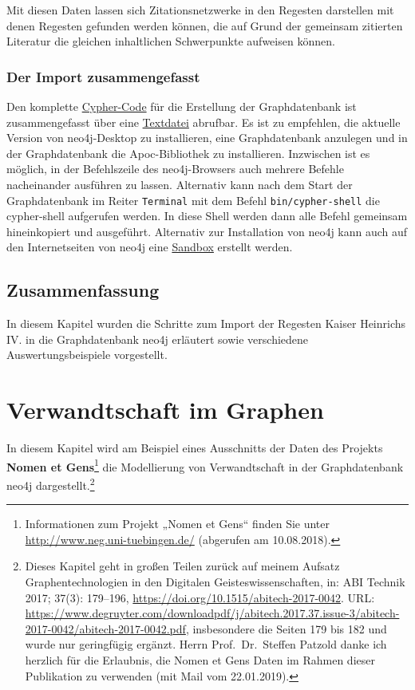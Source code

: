 \documentclass[ngerman,]{scrreprt}
\begin{document}
Mit diesen Daten lassen sich Zitationsnetzwerke in den Regesten darstellen mit denen Regesten gefunden werden können, die auf Grund der gemeinsam zitierten Literatur die gleichen inhaltlichen Schwerpunkte aufweisen können.

\hypertarget{der-import-zusammengefasst}{%
\subsection{Der Import zusammengefasst}\label{der-import-zusammengefasst}}

Den komplette \href{cypher/20_cypher-Datenbankerstellung.txt}{Cypher-Code} für die Erstellung der Graphdatenbank ist zusammengefasst über eine \href{cypher/20_cypher-Datenbankerstellung.txt}{Textdatei} abrufbar. Es ist zu empfehlen, die aktuelle Version von neo4j-Desktop zu installieren, eine Graphdatenbank anzulegen und in der Graphdatenbank die Apoc-Bibliothek zu installieren. Inzwischen ist es möglich, in der Befehlszeile des neo4j-Browsers auch mehrere Befehle nacheinander ausführen zu lassen. Alternativ kann nach dem Start der Graphdatenbank im Reiter \texttt{Terminal} mit dem Befehl \texttt{bin/cypher-shell} die cypher-shell aufgerufen werden. In diese Shell werden dann alle Befehl gemeinsam hineinkopiert und ausgeführt. Alternativ zur Installation von neo4j kann auch auf den Internetseiten von neo4j eine \href{https://neo4j.com/lp/try-neo4j-sandbox}{Sandbox} erstellt werden.

\hypertarget{zusammenfassung-2}{%
\section{Zusammenfassung}\label{zusammenfassung-2}}

In diesem Kapitel wurden die Schritte zum Import der Regesten Kaiser Heinrichs IV. in die Graphdatenbank neo4j erläutert sowie verschiedene Auswertungsbeispiele vorgestellt.

\hypertarget{verwandtschaft-im-graphen}{%
\chapter{Verwandtschaft im Graphen}\label{verwandtschaft-im-graphen}}

In diesem Kapitel wird am Beispiel eines Ausschnitts der Daten des Projekts \textbf{Nomen et Gens}\footnote{Informationen zum Projekt „Nomen et Gens`` finden Sie unter \url{http://www.neg.uni-tuebingen.de/} (abgerufen am 10.08.2018).} die Modellierung von Verwandtschaft in der Graphdatenbank neo4j dargestellt.\footnote{Dieses Kapitel geht in großen Teilen zurück auf meinem Aufsatz Graphentechnologien in den Digitalen Geisteswissenschaften, in: ABI Technik 2017; 37(3): 179--196, \url{https://doi.org/10.1515/abitech-2017-0042}. URL: \url{https://www.degruyter.com/downloadpdf/j/abitech.2017.37.issue-3/abitech-2017-0042/abitech-2017-0042.pdf}, insbesondere die Seiten 179 bis 182 und wurde nur geringfügig ergänzt. Herrn Prof.~Dr.~Steffen Patzold danke ich herzlich für die Erlaubnis, die Nomen et Gens Daten im Rahmen dieser Publikation zu verwenden (mit Mail vom 22.01.2019).}
\end{document}
